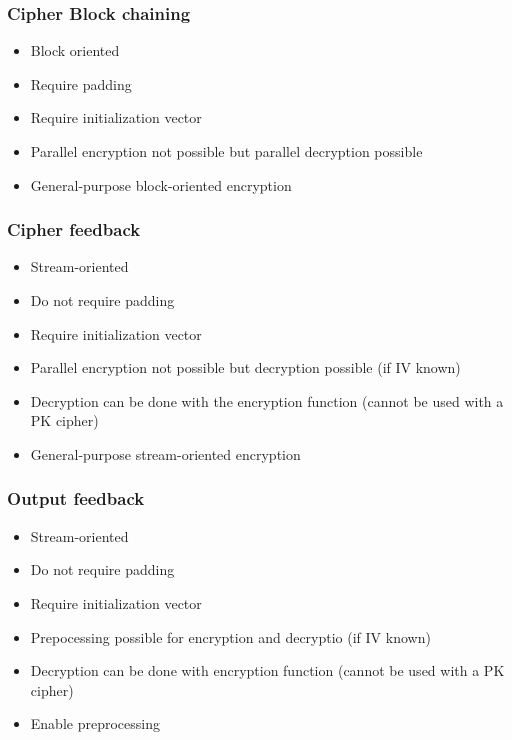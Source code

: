 \subsubsection{Cipher Block chaining}

\begin{itemize}
    \item Block oriented
    \item Require padding
    \item Require initialization vector
    \item Parallel encryption not possible but parallel decryption possible
    \item General-purpose block-oriented encryption
\end{itemize}

\subsubsection{Cipher feedback}

\begin{itemize}
    \item Stream-oriented
    \item Do not require padding
    \item Require initialization vector
    \item Parallel encryption not possible but decryption possible (if IV known)
    \item Decryption can be done with the encryption function
    (cannot be used with a PK cipher)
    \item General-purpose stream-oriented encryption
\end{itemize}

\subsubsection{Output feedback}

\begin{itemize}
    \item Stream-oriented
    \item Do not require padding
    \item Require initialization vector
    \item Prepocessing possible for encryption and decryptio (if IV known)
    \item Decryption can be done with encryption function
    (cannot be used with a PK cipher)
    \item Enable preprocessing
\end{itemize}

